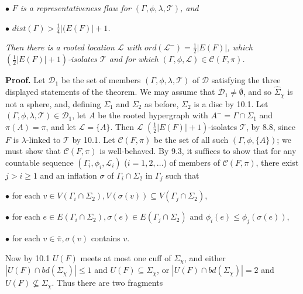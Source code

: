 \hspace*{12pt}$\bullet$ \textit{$F$ is a representativeness flaw for $(\Gamma, \phi, \lambda, \mathscr{T})$, and}

\hspace*{12pt}$\bullet$ \textit{$dist(\Gamma) > \frac{1}{4}|(E(F)| + 1$.}

\textit{Then there is a rooted location $\mathscr{L}$ with $ord(\mathscr{L}^-) = \frac{1}{2}|E(F)|$, which $(\frac{1}{2}|E(F)| + 1)$-isolates $\mathscr{T}$ and for which $(\Gamma, \phi, \mathscr{L}) \in \mathscr{C}(F, \pi)$.}

\textbf{Proof.} Let $\mathscr{D}_1$ be the set of members $(\Gamma, \phi, \lambda, \mathscr{T})$ of $\mathscr{D}$ satisfying the three displayed statements of the theorem. We may assume that $\mathscr{D}_1 \ne \emptyset$, and so $\hat{\Sigma}_\chi$ is not a sphere, and, defining $\Sigma_1$ and $\Sigma_2$ as before, $\Sigma_2$ is a disc by 10.1. Let $(\Gamma, \phi, \lambda, \mathscr{T}) \in \mathscr{D}_1$, let $A$ be the rooted hypergraph with $A^- = \Gamma \cap \Sigma_1$ and $\pi(A) = \pi$, and let $\mathscr{L} = \{A\}$. Then $\mathscr{L}$ $(\frac{1}{2}|E(F)| + 1)$-isolates $\mathscr{T}$, by 8.8, since $F$ is $\lambda$-linked to $\mathscr{T}$ by 10.1. Let $\mathscr{C}(F, \pi)$ be the set of all such $(\Gamma, \phi, \{A\})$; we must show that $\mathscr{C}(F, \pi)$ is well-behaved. By 9.3, it suffices to show that for any countable sequence $(\Gamma_i, \phi_i, \mathscr{L}_i)$ ($i = 1, 2, \dots$) of members of $\mathscr{C}(F, \pi)$, there exist $j > i \ge 1$ and an inflation $\sigma$ of $\Gamma_i \cap \Sigma_2$ in $\Gamma_j$ such that

\hspace*{12pt}$\bullet$ for each $v \in V(\Gamma_i \cap \Sigma_2), V(\sigma(v)) \subseteq V(\Gamma_j \cap \Sigma_2)$,

\hspace*{12pt}$\bullet$ for each $e \in E(\Gamma_i \cap \Sigma_2), \sigma(e) \in E(\Gamma_j \cap \Sigma_2)$ and $\phi_i(e) \le \phi_j(\sigma(e))$,

\hspace*{12pt}$\bullet$ for each $v \in \bar{\pi}, \sigma(v)$ contains $v$.

Now by 10.1 $U(F)$ meets at most one cuff of $\Sigma_\chi$, and either $|U(F) \cap bd(\Sigma_\chi)| \le 1$ and $U(F) \subseteq \Sigma_\chi$, or $|U(F) \cap bd(\Sigma_\chi)| = 2$ and $U(F) \not\subseteq \Sigma_\chi$. Thus there are two fragments
